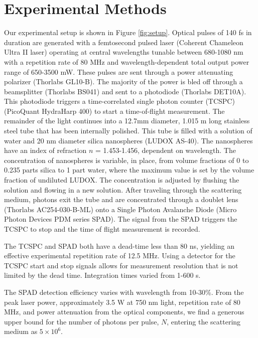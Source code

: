 \section{Experimental Methods}\label{sec:exp_meth}
Our experimental setup is shown in Figure \ref{fig:setup}. Optical pulses of 140 fs in duration are generated with a femtosecond pulsed laser (Coherent Chameleon Ultra II laser) operating at central wavelengths tunable between 680-1080 nm with a repetition rate of 80 MHz and wavelength-dependent total output power range of 650-3500 mW. These pulses are sent through a power attenuating polarizer (Thorlabs GL10-B).  The majority of the power is bled off through a beamsplitter (Thorlabs BS041) and sent to a photodiode (Thorlabs DET10A).  This photodiode triggers a time-correlated single photon counter (TCSPC) (PicoQuant HydraHarp 400) to start a time-of-flight measurement.  The remainder of the light continues into a 12.7mm diameter, 1.015 m long stainless steel tube that has been internally polished.  This tube is filled with a solution of water and 20 nm diameter silica nanospheres (LUDOX AS-40). The nanospheres have an index of refraction $n$ = 1.453-1.456, dependent on wavelength.  The concentration of nanospheres is variable, in place, from volume fractions of 0 to 0.235 parts silica to 1 part water, where the maximum value is set by the volume fraction of undiluted LUDOX. The  concentration is adjusted by flushing the solution and flowing in a new solution.  After traveling through the scattering medium, photons exit the tube and are concentrated through a doublet lens (Thorlabs AC254-030-B-ML) onto a Single Photon Avalanche Diode (Micro Photon Devices PDM series SPAD).  The signal from the SPAD triggers the TCSPC to stop and the time of flight measurement is recorded. 

The TCSPC and SPAD both have a dead-time less than 80 ns, yielding an effective experimental repetition rate of 12.5 MHz. Using a detector for the TCSPC start and stop signals allows for measurement resolution that is not limited by the dead time. Integration times varied from 1-600 s.

The SPAD detection efficiency varies with wavelength from 10-30\%. From the peak laser power, approximately 3.5 W at 750 nm light, repetition rate of 80 MHz, and power attenuation from the optical components, we find a generous upper bound for the number of photons per pulse, $N$, entering the scattering medium as $5 \times 10^{6}$.

